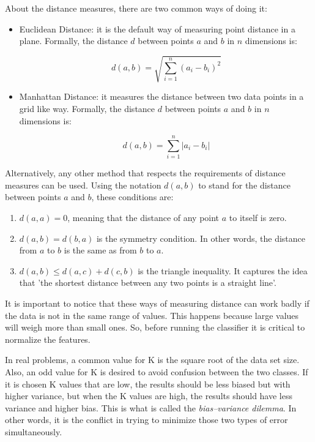 About the distance measures, there are two common ways of doing it:

\begin{itemize}
    \item Euclidean Distance: it is the default way of measuring point distance in a plane. Formally, the distance $d$ between points $a$ and $b$ in $n$ dimensions is:

    \begin{equation}d(a,b) = \sqrt{\sum_{i=1}^n {(a_i - b_i)}^2}\end{equation}

    \item Manhattan Distance: it measures the distance between two data points in a grid like way. Formally, the distance $d$ between points $a$ and $b$ in $n$ dimensions is:
    
    \begin{equation} d(a,b) = \sum_{i=1}^n {|a_i - b_i|} \end{equation}
\end{itemize}

Alternatively, any other method that respects the requirements of distance measures can be used. Using the notation $d(a,b)$ to stand for the distance between points $a$ and $b$, these conditions are:

\begin{enumerate}
    \item $d(a,a) = 0$, meaning that the distance of any point $a$ to itself is zero.
    \item $d(a,b) = d(b,a)$ is the symmetry condition. In other words, the distance from $a$ to $b$ is the same as from $b$ to $a$.
    \item $d(a,b) \le d(a,c) + d(c,b)$ is the triangle inequality. It captures the idea that 'the shortest distance between any two points is a straight line'.
\end{enumerate}

It is important to notice that these ways of measuring distance can work badly if the data is not in the same range of values. This happens because large values will weigh more than small ones. So, before running the classifier it is critical to normalize the features.

In real problems, a common value for K is the square root of the data set size. Also, an odd value for K is desired to avoid confusion between the two classes. If it is chosen K values that are low, the results should be less biased but with higher variance, but when the K values are high, the results should have less variance and higher bias. This is what is called the \emph{bias–variance dilemma}. In other words, it is the conflict in trying to minimize those two types of error simultaneously.

